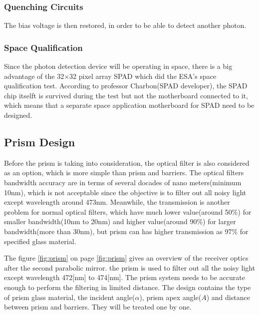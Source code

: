 \subsubsection{Quenching Circuits}
\label{AQC}
The bias voltage is then restored, in order to be able to detect another photon. 

\subsubsection{Space Qualification}
\label{SQ}
Since the photon detection device will be operating in space, there is a big advantage of the 32$\times$32 pixel array \acs{SPAD} which did the \acs{ESA}'s space qualification test. According to professor Charbon(\acs{SPAD} developer), the \acs{SPAD} chip itselft is survived during the test but not the motherboard connected to it, which means that a separate space application motherboard for \acs{SPAD} need to be designed.

\subsection{Prism Design}
\label{prism}
Before the prism is taking into consideration, the optical filter is also considered as an option, which is more simple than prism and barriers. The optical filters bandwidth accuracy are in terms of several docades of nano meters(minimum 10nm\cite{optical_filter}), which is not acceptable since the objective is to filter out all noisy light except wavelength around 473nm. Meanwhile, the transmission is another problem for normal optical filters, which have much lower value(around 50\%) for smaller bandwidth(10nm to 20nm) and higher value(around 90\%) for larger bandwidth(more than 30nm), but prism can has higher transmission as 97\% for specified glass material.

The figure \ref{fig:prism} on page \ref{fig:prism} gives an overview of the receiver optics after the second parabolic mirror. the prism is used to filter out all the noisy light except wavelength 472[nm] to 474[nm]. The prism system needs to be accurate enough to perform the filtering in limited distance. The design contains the type of prism glass material, the incident angle($\alpha$), prism apex angle($A$) and distance between prism and barriers. They will be treated one by one.

